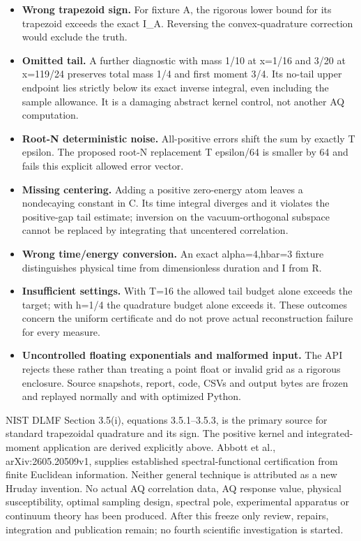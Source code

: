 \begin{itemize}
\tightlist
\item
  \textbf{Wrong trapezoid sign.} For fixture A, the rigorous lower bound for its trapezoid exceeds the exact I\_A. Reversing the convex-quadrature correction would exclude the truth.
\item
  \textbf{Omitted tail.} A further diagnostic with mass 1/10 at x=1/16 and 3/20 at x=119/24 preserves total mass 1/4 and first moment 3/4. Its no-tail upper endpoint lies strictly below its exact inverse integral, even including the sample allowance. It is a damaging abstract kernel control, not another AQ computation.
\item
  \textbf{Root-N deterministic noise.} All-positive errors shift the sum by exactly T epsilon. The proposed root-N replacement T epsilon/64 is smaller by 64 and fails this explicit allowed error vector.
\item
  \textbf{Missing centering.} Adding a positive zero-energy atom leaves a nondecaying constant in C. Its time integral diverges and it violates the positive-gap tail estimate; inversion on the vacuum-orthogonal subspace cannot be replaced by integrating that uncentered correlation.
\item
  \textbf{Wrong time/energy conversion.} An exact alpha=4,hbar=3 fixture distinguishes physical time from dimensionless duration and I from R.
\item
  \textbf{Insufficient settings.} With T=16 the allowed tail budget alone exceeds the target; with h=1/4 the quadrature budget alone exceeds it. These outcomes concern the uniform certificate and do not prove actual reconstruction failure for every measure.
\item
  \textbf{Uncontrolled floating exponentials and malformed input.} The API rejects these rather than treating a point float or invalid grid as a rigorous enclosure. Source snapshots, report, code, CSVs and output bytes are frozen and replayed normally and with optimized Python.
\end{itemize}

NIST DLMF Section 3.5(i), equations 3.5.1--3.5.3, is the primary source for standard trapezoidal quadrature and its sign. The positive kernel and integrated-moment application are derived explicitly above. Abbott et al., arXiv:2605.20509v1, supplies established spectral-functional certification from finite Euclidean information. Neither general technique is attributed as a new Hruday invention. No actual AQ correlation data, AQ response value, physical susceptibility, optimal sampling design, spectral pole, experimental apparatus or continuum theory has been produced. After this freeze only review, repairs, integration and publication remain; no fourth scientific investigation is started.

